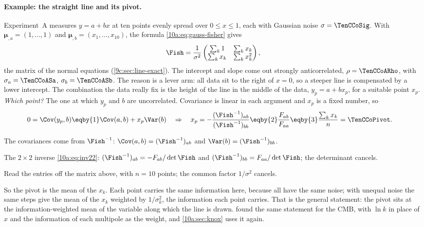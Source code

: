 \paragraph{Example: the straight line and its pivot.} Experiment~A measures $y=a+bx$ at ten points evenly spread
over $0\le x\le1$, each with Gaussian noise $\sigma=\TenCCoSig$. With $\bm\mu_{,a}=(1,\dots,1)$ and $\bm\mu_{,b}=(x_1,\dots,x_{10})$,
the formula \eqref{10a:eq:gauss-fisher} gives
\[
  \Fish=\frac1{\sigma^2}\begin{pmatrix}\sum_k1&\sum_kx_k\\ \sum_kx_k&\sum_kx_k^2\end{pmatrix},
\]
the matrix of the normal equations (\cref{9c:sec:line-exact}). The intercept and slope come out strongly
anticorrelated, $\rho=\TenCCoARho$, with $\sigma_a=\TenCCoASa$, $\sigma_b=\TenCCoASb$. The reason is a lever arm:
all data sit to the right of $x=0$, so a steeper line is compensated by a lower intercept. The combination the
data really fix is the height of the line in the middle of the data, $y_p=a+bx_p$, for a suitable point
$x_p$. \emph{Which point?} The one at which $y_p$ and $b$ are uncorrelated. Covariance is linear in each
argument and $x_p$ is a fixed number, so
\begin{align*}
  0=\Cov(y_p,b)
  &\eqby{1}\Cov(a,b)+x_p\Var(b)
  \quad\Rightarrow\quad
  x_p=-\frac{(\Fish^{-1})_{ab}}{(\Fish^{-1})_{bb}}
  \eqby{2}\frac{F_{ab}}{F_{aa}}
  \eqby{3}\frac{\sum_kx_k}{n}=\TenCCoPivot .
\end{align*}
\begin{explain}
  \item The covariances come from $\Fish^{-1}$: $\Cov(a,b)=(\Fish^{-1})_{ab}$ and $\Var(b)=(\Fish^{-1})_{bb}$.
  \item The $2\times2$ inverse \eqref{10a:eq:inv22}: $(\Fish^{-1})_{ab}=-F_{ab}/\det\Fish$ and $(\Fish^{-1})_{bb}=F_{aa}/\det\Fish$; the
        determinant cancels.
  \item Read the entries off the matrix above, with $n=10$ points; the common factor $1/\sigma^2$ cancels.
\end{explain}
So the pivot is the mean of the $x_k$. Each point carries the same information here, because all have the
same noise; with unequal noise the same steps give the mean of the $x_k$ weighted by $1/\sigma_k^2$, the
information each point carries. That is the general statement: the pivot sits at the information-weighted
mean of the variable along which the line is drawn.  found the same statement for the
CMB, with $\ln k$ in place of $x$ and the information of each multipole as the weight, and \cref{10a:sec:knox}
uses it again.

